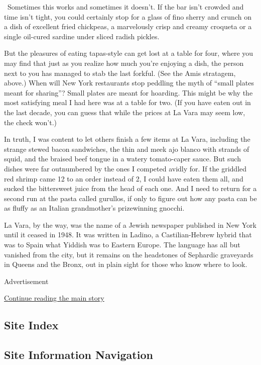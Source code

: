 ~Sometimes this works and sometimes it doesn't. If the bar isn't crowded
and time isn't tight, you could certainly stop for a glass of fino
sherry and crunch on a dish of excellent fried chickpeas, a marvelously
crisp and creamy croqueta or a single oil-cured sardine under sliced
radish pickles.

But the pleasures of eating tapas-style can get lost at a table for
four, where you may find that just as you realize how much you're
enjoying a dish, the person next to you has managed to stab the last
forkful. (See the Amis stratagem, above.) When will New York restaurants
stop peddling the myth of ``small plates meant for sharing''? Small
plates are meant for hoarding. This might be why the most satisfying
meal I had here was at a table for two. (If you have eaten out in the
last decade, you can guess that while the prices at La Vara may seem
low, the check won't.)

In truth, I was content to let others finish a few items at La Vara,
including the strange stewed bacon sandwiches, the thin and meek ajo
blanco with strands of squid, and the braised beef tongue in a watery
tomato-caper sauce. But such dishes were far outnumbered by the ones I
competed avidly for. If the griddled red shrimp came 12 to an order
instead of 2, I could have eaten them all, and sucked the bittersweet
juice from the head of each one. And I need to return for a second run
at the pasta called gurullos, if only to figure out how any pasta can be
as fluffy as an Italian grandmother's prizewinning gnocchi.

La Vara, by the way, was the name of a Jewish newspaper published in New
York until it ceased in 1948. It was written in Ladino, a
Castilian-Hebrew hybrid that was to Spain what Yiddish was to Eastern
Europe. The language has all but vanished from the city, but it remains
on the headstones of Sephardic graveyards in Queens and the Bronx, out
in plain sight for those who know where to look.

Advertisement

\protect\hyperlink{after-bottom}{Continue reading the main story}

\hypertarget{site-index}{%
\subsection{Site Index}\label{site-index}}

\hypertarget{site-information-navigation}{%
\subsection{Site Information
Navigation}\label{site-information-navigation}}

